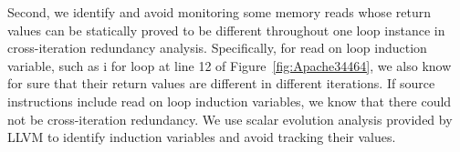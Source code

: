 Second, we identify and avoid monitoring some memory reads whose return values 
can be statically proved to be different throughout one loop instance in 
cross-iteration redundancy analysis.
Specifically, for read on loop induction variable, such as i for loop at line 12 of Figure~\ref{fig:Apache34464}, 
we also know for sure that their return
values are different in different iterations. 
If source instructions include read on loop induction variables, we know that 
there could not be cross-iteration redundancy. 
We use scalar evolution analysis
provided by LLVM to identify induction variables and avoid tracking their
values.

%


 


